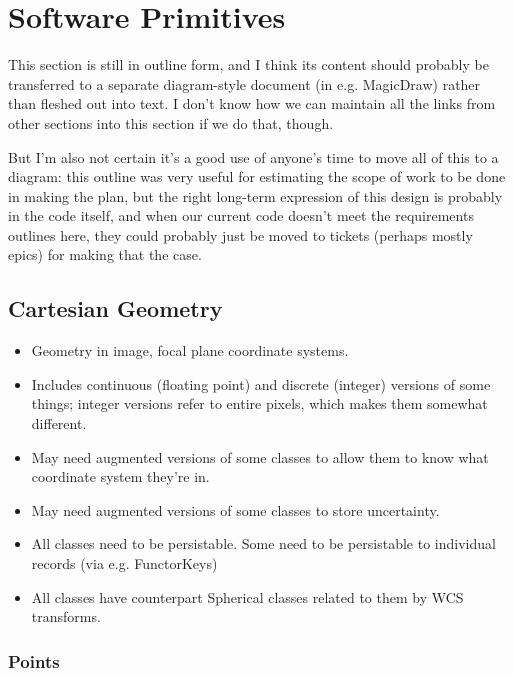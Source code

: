 \section{Software Primitives}
\label{sec:software-primitives}

\begin{note}[JFB]
This section is still in outline form, and I think its content should probably be transferred to a separate diagram-style document (in e.g. MagicDraw) rather than fleshed out into text.  I don't know how we can maintain all the links from other sections into this section if we do that, though.

But I'm also not certain it's a good use of anyone's time to move all of this to a diagram: this outline was very useful for estimating the scope of work to be done in making the plan, but the right long-term expression of this design is probably in the code itself, and when our current code doesn't meet the requirements outlines here, they could probably just be moved to tickets (perhaps mostly epics) for making that the case.
\end{note}

\subsection{Cartesian Geometry}
\label{sec:spCartesianGeometry}

\begin{itemize}
\item Geometry in image, focal plane coordinate systems.
\item Includes continuous (floating point) and discrete (integer) versions of some things; integer versions refer to entire pixels, which makes them somewhat different.
\item May need augmented versions of some classes to allow them to know what coordinate system they're in.
\item May need augmented versions of some classes to store uncertainty.
\item All classes need to be persistable.  Some need to be persistable to individual records (via e.g. FunctorKeys)
\item All classes have counterpart Spherical classes related to them by WCS transforms.
\end{itemize}

\subsubsection{Points}
\label{sec:spCartesianPoints}

